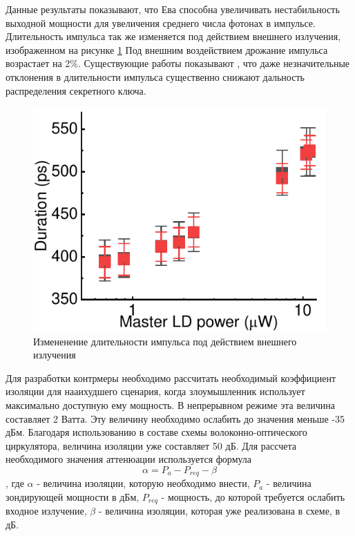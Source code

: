 Данные результаты показывают, что Ева способна увеличивать нестабильность выходной мощности для увеличения среднего числа фотонах в импульсе. Длительность импульса так же изменяется под действием внешнего излучения, изображенном на рисунке \ref{fig:duration ref} Под внешним воздействием дрожание импульса возрастает на 2\%.  Существующие работы показывают \cite{xie2019}, что даже незначительные отклонения в длительности импульса существенно снижают дальность распределения секретного ключа. 
\begin{figure}
    \centering
    \includegraphics{images/duration_change.pdf}
    \caption{Измененение длительности импульса под действием внешнего излучения}
    \label{fig:duration ref}
\end{figure}
\newline Для разработки контрмеры необходимо рассчитать необходимый коэффициент изоляции для нааихудшего сценария, когда злоумышленник использует максимально доступную ему мощность. В непрерывном режиме эта величина составляет 2 Ватта. Эту величину необходимо ослабить до значения меньше -35 дБм. Благодаря использованию в составе схемы волоконно-оптического циркулятора, величина изоляции уже составляет 50 дБ.  Для рассчета необходимого значения аттенюации используется формула
\begin{equation}
\label{eq:isolation}
    \alpha = P_a - P_{req} - \beta
\end{equation}, где $\alpha$ - величина изоляции, которую необходимо внести, $P_a$ - величина зондирующей мощности в дБм, $P_{req}$ - мощность, до которой требуется ослабить входное излучение, $\beta$ - величина изоляции, которая уже реализована в схеме, в дБ. 
